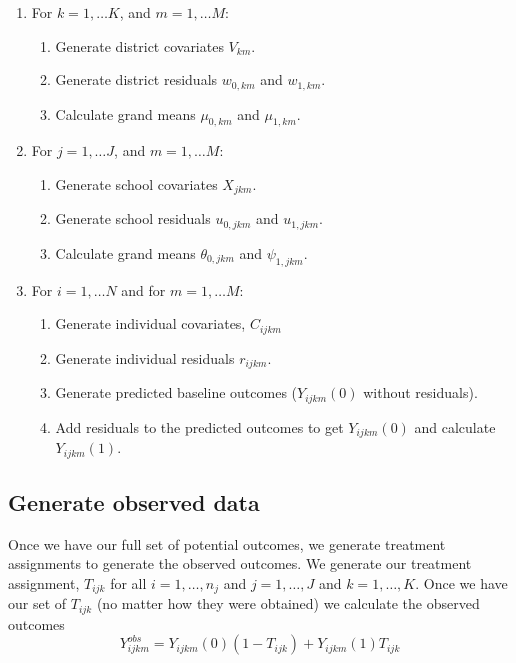 \documentclass[12pt]{article}
\begin{document}
\begin{enumerate}
	\item For $k = 1, \ldots K$, and $m = 1, \ldots M$:
	\begin{enumerate}
		\item Generate district covariates $V_{km}$.
		\item Generate district residuals $w_{0,km}$ and $w_{1,km}$.
		\item Calculate grand means $\mu_{0,km}$ and $\mu_{1,km}$.
	\end{enumerate}
	\item For $j = 1, \ldots J$, and $m = 1, \ldots M$:
	\begin{enumerate}
		\item Generate school covariates $X_{jkm}$.
		\item Generate school residuals $u_{0,jkm}$ and $u_{1,jkm}$.
		\item Calculate grand means $\theta_{0,jkm}$ and $\psi_{1,jkm}$.
	\end{enumerate}
	\item For $i = 1, \ldots N$ and for $m = 1, \ldots M$:
	\begin{enumerate}
		\item Generate individual covariates, $C_{ijkm}$ 
		\item Generate individual residuals $r_{ijkm}$.
		\item Generate predicted baseline outcomes ($Y_{ijkm}(0)$ without residuals).
		\item Add residuals to the predicted outcomes to get $Y_{ijkm}(0)$ and calculate $Y_{ijkm}(1)$.
	\end{enumerate}
	
\end{enumerate}


\subsection{Generate observed data}

Once we have our full set of potential outcomes, we generate treatment assignments to generate the observed outcomes.
We generate our treatment assignment, $T_{ijk}$ for all $i = 1, \ldots, n_j$ and $j = 1, \ldots, J$ and $k = 1, \ldots, K$.
Once we have our set of $T_{ijk}$ (no matter how they were obtained) we calculate the observed outcomes
\begin{equation}
Y_{ijkm}^{obs} = Y_{ijkm}(0) (1-T_{ijk}) + Y_{ijkm}(1) T_{ijk}
\end{equation}
\end{document}
